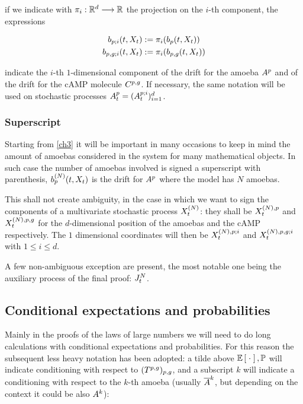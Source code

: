 \ie if we indicate with $\pi_i: \mathbb{R}^d \longrightarrow \mathbb{R}$ the projection on the $i$-th component, the expressions

\begin{gather*}
	b_{p; i}(t, X_t) : = \pi_i ( b_{p}(t, X_t) )
	\\
	b_{p,g; i}(t, X_t) := \pi_i ( b_{p,g}(t, X_t) )
\end{gather*}

indicate the $i$-th $1$-dimensional component of the drift for the amoeba $A^p$ and of the drift for the cAMP molecule $C^{p,g}$.
If necessary, the same notation will be used on stochastic processes $A_t^{p} = ( A_t^{p;i} )_{i =1}^d$. 

\subsubsection{Superscript}

Starting from \ref{ch3} it will be important in many occasions to keep in mind the amount of amoebas considered in the system for many mathematical objects.
In such case the number of amoebas involved is signed a superscript with parenthesis, \eg $b_{p}^{(N)}(t, X_t)$ is the drift for $A^p$ where the model has $N$ amoebas.

This shall not create ambiguity, in the case in which we want to sign the components of a multivariate stochastic process $X_t^{(N)}$: they shall be $X_t^{(N),p}$ and  $X_t^{(N),p,g}$ for the $d$-dimensional position of the amoebas and the cAMP respectively. The $1$ dimensional coordinates will then be $X_t^{(N),p;i}$ and  $X_t^{(N),p,g;i}$ with $1 \leq i \leq d$.

A few non-ambiguous exception are present, the most notable one being the auxiliary process of the final proof: $J_t^N$.

\subsection{Conditional expectations and probabilities}

Mainly in the proofs of the laws of large numbers we will need to do long calculations with conditional expectations and probabilities.
For this reason the subsequent less heavy notation has been adopted: a tilde above $\mathbb{E} \left[ \; \cdot \; \right], \mathbb{P}$ will indicate conditioning with respect to $ (T^{p,g})_{p,g}$, and a subscript $k$ will indicate a conditioning with respect to the $k$-th amoeba (usually $\overline{A}^k$, but depending on the context it could be also $A^k$):

